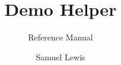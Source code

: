 \documentclass{technical-reference-manual}
\title{Demo Helper}
\subtitle{Reference Manual}
\author{Samuel Lewis}
\begin{document}
	
	\graphicspath{ {./assets/} }
	
	\maketitle
	
	\tableofcontents
	\newpage
	
	
	\pagebreak
	
	\pagebreak
	
\end{document}
